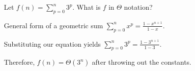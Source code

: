 \begin{prob}
    Let $f(n) = \sum_{p=0}^n 3^p$. What is $f$ in $\Theta$ notation?
    
    \begin{soln}
        
        General form of a geometric sum $\displaystyle \sum_{p=0}^n x^p = \frac{1-x^{n+1}}{1-x}$.
        
        Substituting our equation yields $\displaystyle \sum_{p=0}^n 3^p = \frac{1-3^{n+1}}{1-3}$.
        
        Therefore, $\boxed{f(n)=\Theta(3^n)}$ after throwing out the constants.
    
    \end{soln}
    
\end{prob}
